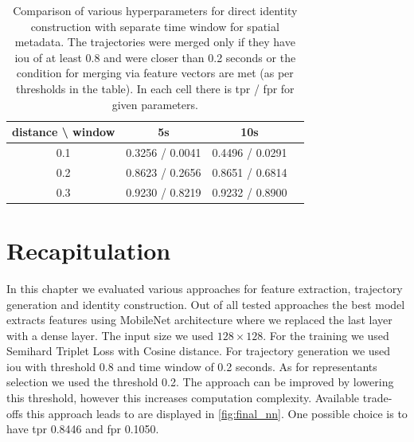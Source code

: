\begin{table}[]
    \centering
    \begin{tabular}{c||c|c|c}
     distance \textbackslash{} window & 5s & 10s \\ \hline \hline
     0.1 & 0.3256 / 0.0041 & 0.4496 / 0.0291  \\ \hline
     0.2 & 0.8623 / 0.2656 & 0.8651 / 0.6814 \\ \hline
     0.3 & 0.9230 / 0.8219 & 0.9232 / 0.8900
    \end{tabular}
    \caption[Comparison of various hyperparameters for direct identity construction with separate time window for spatial metadata]{Comparison of various hyperparameters for direct identity construction with separate time window for spatial metadata. The trajectories were merged only if they have \gls{iou} of at least 0.8 and were closer than 0.2 seconds or the condition for merging via feature vectors are met (as per thresholds in the table). In each cell there is \gls{tpr} / \gls{fpr} for given parameters.}
    \label{tab:direct_time_window}
\end{table}

\section{Recapitulation}

In this chapter we evaluated various approaches for feature extraction, trajectory generation and identity construction. Out of all tested approaches the best model extracts features using MobileNet architecture where we replaced the last layer with a dense layer. The input size we used $128 \times 128$. For the training we used Semihard Triplet Loss with Cosine distance. For trajectory generation we used \gls{iou} with threshold 0.8 and time window of 0.2 seconds. As for representants selection we used  the threshold 0.2. The approach can be improved by lowering this threshold, however this increases computation complexity. Available trade-offs this approach leads to are displayed in \autoref{fig:final_nn}. One possible choice is to have \gls{tpr} 0.8446 and \gls{fpr} 0.1050.